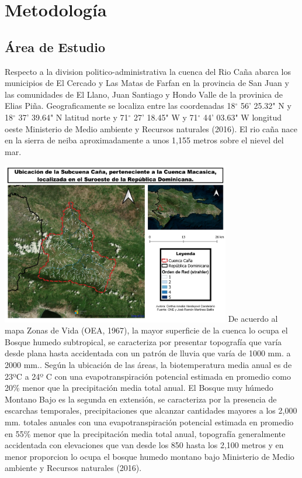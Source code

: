 \documentclass[11pt,]{article}
\begin{document}
\section{Metodología}\label{metodologuxeda}

\subsection{Área de Estudio}\label{uxe1rea-de-estudio}

Respecto a la division politico-administrativa la cuenca del Rio Caña
abarca los municipios de El Cercado y Las Matas de Farfan en la
provincia de San Juan y las comunidades de El Llano, Juan Santiago y
Hondo Valle de la provinica de Elias Piña. Geograficamente se localiza
entre las coordenadas 18\(^\circ\) 56' 25.32" N y 18\(^\circ\) 37'
39.64" N latitud norte y 71\(^\circ\) 27' 18.45" W y 71\(^\circ\) 44'
03.63" W longitud oeste Ministerio de Medio ambiente y Recursos
naturales (2016). El rio caña nace en la sierra de neiba aproximadamente
a unos 1,155 metros sobre el nievel del mar.

\includegraphics[width=0.75000\textwidth]{mapa_de_subcuenca_cana.jpg} De
acuerdo al mapa Zonas de Vida (OEA, 1967), la mayor superficie de la
cuenca lo ocupa el Bosque humedo subtropical, se caracteriza por
presentar topografía que varía desde plana hasta accidentada con un
patrón de lluvia que varía de 1000 mm. a 2000 mm.. Según la ubicación de
las áreas, la biotemperatura media anual es de 23ºC a 24º C con una
evapotranspiración potencial estimada en promedio como 20\% menor que la
precipitación media total anual. El Bosque muy húmedo Montano Bajo es la
segunda en extensión, se caracteriza por la presencia de escarchas
temporales, precipitaciones que alcanzar cantidades mayores a los 2,000
mm. totales anuales con una evapotranspiración potencial estimada en
promedio en 55\% menor que la precipitación media total anual,
topografía generalmente accidentada con elevaciones que van desde los
850 hasta los 2,100 metros y en menor proporcion lo ocupa el bosque
humedo montano bajo Ministerio de Medio ambiente y Recursos naturales
(2016).
\end{document}
